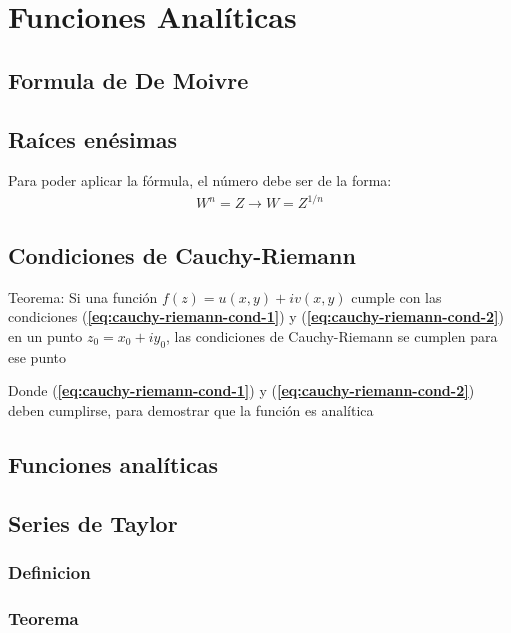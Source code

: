 \section{Funciones Analíticas}

\subsection{Formula de De Moivre}


\subsection{Raíces enésimas}


Para poder aplicar la fórmula, el número debe ser de la forma:
\begin{align}
    W^n = Z \longrightarrow W = Z^{1/n} \nonumber
\end{align}

\subsection{Condiciones de Cauchy-Riemann}
Teorema: Si una función \( f(z) = u(x, y) + iv(x,y) \) cumple con las condiciones (\textbf{\ref{eq:cauchy-riemann-cond-1}}) y (\textbf{\ref{eq:cauchy-riemann-cond-2}}) en un punto \( z_0 = x_0 + iy_0 \), las condiciones de Cauchy-Riemann se cumplen para ese punto



Donde (\textbf{\ref{eq:cauchy-riemann-cond-1}}) y (\textbf{\ref{eq:cauchy-riemann-cond-2}}) deben cumplirse, para demostrar que la función es analítica

\subsection{Funciones analíticas}


\subsection{Series de Taylor}

\subsubsection{Definicion}
    

\subsubsection{Teorema}
    


